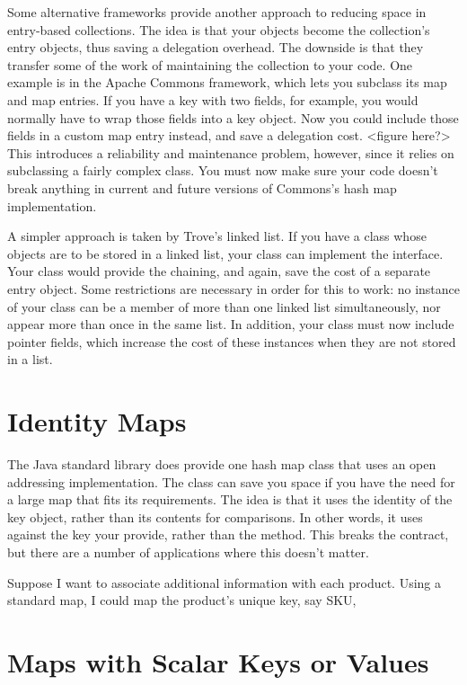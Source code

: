 Some alternative frameworks provide another approach to reducing space in
entry-based collections. The idea is that your objects become
the collection's entry objects, thus saving a delegation overhead. The downside
is that they transfer some of the work of maintaining the collection to your code.
One example is in the Apache Commons framework, which lets you subclass its map
and map entries. If you have a key with two fields, for example, you would
normally have to wrap those fields into a key object. Now 
you could include those fields in a custom map entry instead, and save a
delegation cost. <figure here?>  This introduces a reliability and maintenance
problem, however, since it relies on subclassing a fairly complex class. You must now make sure
your code doesn't break anything in current and future versions of Commons's
hash map implementation.

A simpler approach is taken by Trove's linked list. If you have a class whose
objects are to be stored in a linked list, your class can implement the
 interface. Your class would provide the chaining, and
again, save the cost of a separate entry object.  Some restrictions are
necessary in order for this to work: no instance of your class can
be a member of more than one linked list simultaneously, nor appear more than
once in the same list. In addition, your class must now include
pointer fields, which increase the cost of these instances when they are
not stored in a list.

\section{Identity Maps}
The Java standard library does provide one hash map class that uses an open
addressing implementation. The  class can save you space
if you have the need for a large map that fits its requirements.  The idea is that
it uses the identity of the key object, 
rather than its contents for comparisons. In
other words, it uses \code{==} against the key your provide, rather than the
 method. This breaks the  contract, but there are a number of applications where this doesn't matter.  

Suppose I want to associate additional information with each product.  Using a
standard map, I could map the product's unique key, say SKU, 



\section{Maps with Scalar Keys or Values}

